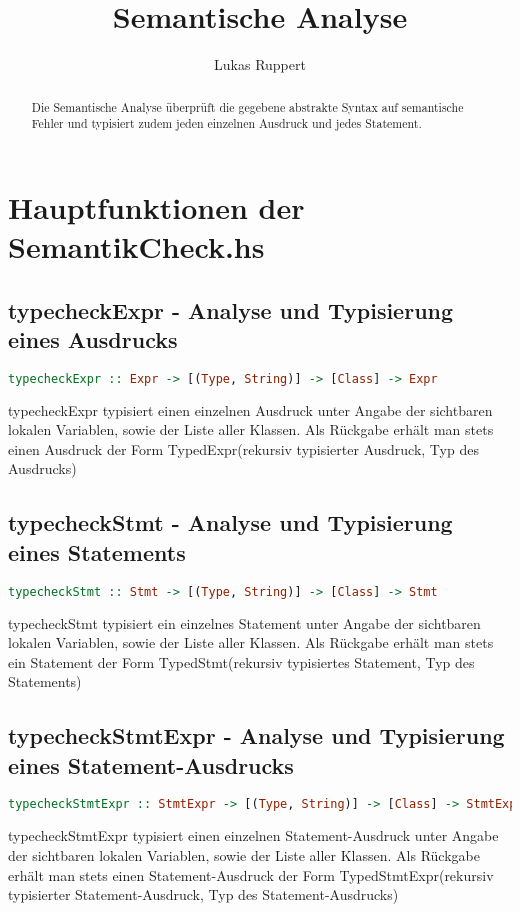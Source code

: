 \documentclass[a4paper,10pt]{article}
\title{Semantische Analyse}
\author{Lukas Ruppert}
\begin{document}
\maketitle

\begin{abstract}
Die Semantische Analyse überprüft die gegebene abstrakte Syntax auf semantische Fehler und typisiert zudem jeden einzelnen Ausdruck und jedes Statement.
\end{abstract}

\newpage
\tableofcontents

\newpage
\section{Hauptfunktionen der SemantikCheck.hs}
\subsection{typecheckExpr - Analyse und Typisierung eines Ausdrucks}
\begin{lstlisting}[language=Haskell]
typecheckExpr :: Expr -> [(Type, String)] -> [Class] -> Expr
\end{lstlisting}
typecheckExpr typisiert einen einzelnen Ausdruck unter Angabe der sichtbaren lokalen Variablen, sowie der Liste aller Klassen.
Als Rückgabe erhält man stets einen Ausdruck der Form TypedExpr(rekursiv typisierter Ausdruck, Typ des Ausdrucks)
\\
\subsection{typecheckStmt - Analyse und Typisierung eines Statements}
\begin{lstlisting}[language=Haskell]
typecheckStmt :: Stmt -> [(Type, String)] -> [Class] -> Stmt
\end{lstlisting}
typecheckStmt typisiert ein einzelnes Statement unter Angabe der sichtbaren lokalen Variablen, sowie der Liste aller Klassen.
Als Rückgabe erhält man stets ein Statement der Form TypedStmt(rekursiv typisiertes Statement, Typ des Statements)
\\
\subsection{typecheckStmtExpr - Analyse und Typisierung eines Statement-Ausdrucks}
\begin{lstlisting}[language=Haskell]
typecheckStmtExpr :: StmtExpr -> [(Type, String)] -> [Class] -> StmtExpr
\end{lstlisting}
typecheckStmtExpr typisiert einen einzelnen Statement-Ausdruck unter Angabe der sichtbaren lokalen Variablen, sowie der Liste aller Klassen.
Als Rückgabe erhält man stets einen Statement-Ausdruck der Form TypedStmtExpr(rekursiv typisierter Statement-Ausdruck, Typ des Statement-Ausdrucks)
\\
\end{document}
